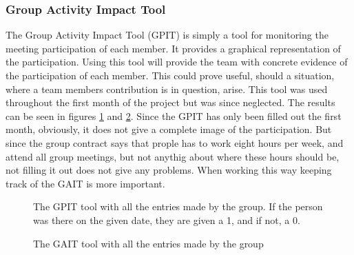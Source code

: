 \subsubsection{Group Activity Impact Tool}
The Group Activity Impact Tool (GPIT) is simply a tool for monitoring the meeting participation of each member. It provides a graphical representation of the participation. Using this tool will provide the team with concrete evidence of the participation of each member. This could prove useful, should a situation, where a team members contribution is in question, arise. This tool was used throughout the first month of the project but was since neglected. The results can be seen in figures \ref{fig:GPIT} and \ref{fig:GPITGraph}. Since the GPIT has only been filled out the first month, obviously, it does not give a complete image of the participation. But since the group contract says that prople has to work eight hours per week, and attend all group meetings, but not anythig about where these hours should be, not filling it out does not give any problems. When working this way keeping track of the GAIT is more important. 

\begin{figure}[h!]

	\caption{The GPIT tool with all the entries made by the group. If the person was there on the given date, they are given a 1, and if not, a 0. }
		\label{fig:GPIT}
\end{figure}


\begin{figure}[h!]

	\caption{The GAIT tool with all the entries made by the group}
	\label{fig:GPITGraph}	
 \end{figure}


